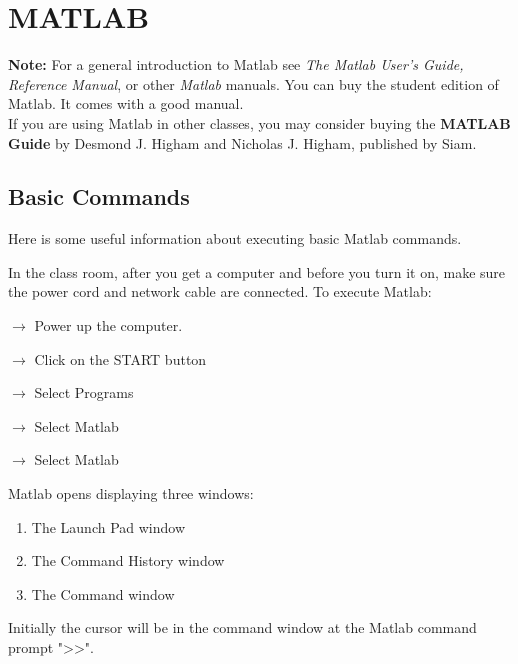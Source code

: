 
\newcommand{\mlc}[1] {\texttt{>> #1 }}
\newcommand{\ttt}[1]{\texttt{#1}}

\section{MATLAB} 

\textbf{Note:} For a general introduction to Matlab see \textit{The
  Matlab User's Guide, Reference Manual}, or other \textit{Matlab}
manuals.  You can buy the student edition of Matlab.  It comes with a
good manual. \\


If you are using Matlab in other classes, you may consider buying the 
\textbf{MATLAB Guide} by Desmond J. Higham and Nicholas J. Higham, published
by Siam.\\ 
  

\subsection{Basic Commands}

Here is some useful information about executing basic Matlab commands.

In the class room, after you get a computer and before you turn it on, make sure 
the power cord and network cable are connected.  To execute Matlab:

$\rightarrow$  Power up the computer.

\hspace{.2in}$\rightarrow$  Click on the START button

\hspace{.4in}$\rightarrow$  Select Programs

\hspace{.6in}$\rightarrow$  Select Matlab

\hspace{.8in}$\rightarrow$  Select Matlab

Matlab opens displaying three windows:
\begin{enumerate}
  \item The Launch Pad window
  \item The Command History window
  \item The Command window
\end{enumerate}

Initially the cursor will be in the command window at the Matlab command prompt
"$\ttt{>>}$".
\vspace{0.25in}

